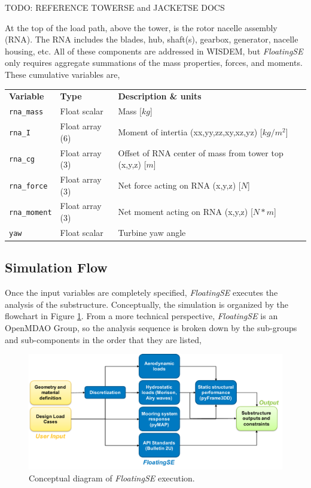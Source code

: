TODO: REFERENCE TOWERSE and JACKETSE DOCS

At the top of the load path, above the tower, is the rotor nacelle
assembly (RNA).  The RNA includes the blades, hub, shaft(s), gearbox,
generator, nacelle housing, etc.  All of these components are addressed
in WISDEM, but \textit{FloatingSE} only requires aggregate summations of
the mass properties, forces, and moments.  These cumulative variables are,

{\footnotesize
  \begin{tabularx}{\linewidth}{ l l X }
    \textbf{Variable} & \textbf{Type} & \textbf{Description \& units} \\
    \texttt{rna\_mass}   & Float scalar & Mass [$kg$]\\
    \texttt{rna\_I}      & Float array (6) & Moment of intertia (xx,yy,zz,xy,xz,yz) [$kg/m^2$]\\
    \texttt{rna\_cg}     & Float array (3) & Offset of RNA center of mass from tower top (x,y,z) [$m$]\\
    \texttt{rna\_force}  & Float array (3) & Net force acting on RNA (x,y,z) [$N$]\\
    \texttt{rna\_moment} & Float array (3) & Net moment acting on RNA (x,y,z) [$N*m$]\\
    \texttt{yaw}         & Float scalar & Turbine yaw angle\\
  \end{tabularx}
}


\subsection{Simulation Flow}
Once the input variables are completely specified, \textit{FloatingSE}
executes the analysis of the substructure.  Conceptually, the simulation
is organized by the flowchart in Figure \ref{fig:floatingse}.  From a
more technical perspective, \textit{FloatingSE} is
an OpenMDAO Group, so the analysis sequence is broken down by the
sub-groups and sub-components in the order that they are listed,

\begin{figure}
  \begin{center}
    \includegraphics[width=5in]{figs/floatingse}
    \caption{Conceptual diagram of \textit{FloatingSE} execution.}
    \label{fig:floatingse}
  \end{center}
\end{figure}

